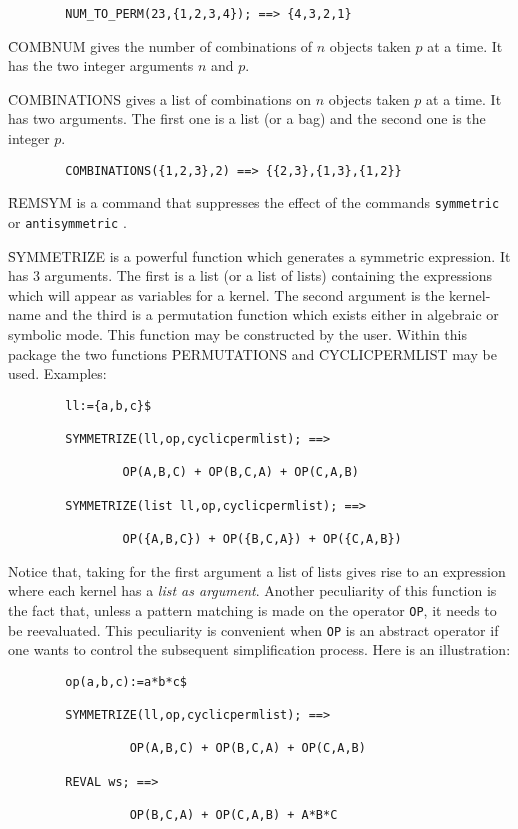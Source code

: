 \begin{itemize}
\begin{verbatim}
        NUM_TO_PERM(23,{1,2,3,4}); ==> {4,3,2,1}
\end{verbatim}
\f{COMBNUM} gives the number of combinations of $n$ objects
taken $p$ at a time. It has the two integer arguments $n$ and $p$.

\f{COMBINATIONS} gives a list of combinations on $n$ objects taken $p$
at a time. It has two arguments. The first one is a list (or a bag) and
the second one is the integer $p$.
\begin{verbatim}
        COMBINATIONS({1,2,3},2) ==> {{2,3},{1,3},{1,2}}
\end{verbatim}
\f{REMSYM} is a command that suppresses the effect of the \REDUCE commands
\verb+symmetric+ or \verb+antisymmetric+ .

\f{SYMMETRIZE} is a powerful function which generates a symmetric expression.
It has 3 arguments. The first is a list (or a list of lists) containing
the expressions which will appear as variables for a kernel. The second
argument is the kernel-name and the third is a permutation function
which exists either in algebraic or symbolic mode. This
function may be constructed by the user. Within this package
the two functions \f{PERMUTATIONS} and \f{CYCLICPERMLIST} may be used.
Examples:
\begin{verbatim}
        ll:={a,b,c}$

        SYMMETRIZE(ll,op,cyclicpermlist); ==>

                OP(A,B,C) + OP(B,C,A) + OP(C,A,B)

        SYMMETRIZE(list ll,op,cyclicpermlist); ==>

                OP({A,B,C}) + OP({B,C,A}) + OP({C,A,B})
\end{verbatim}
Notice that, taking for the first argument a list of lists gives rise to
an expression where  each kernel has a {\em list as argument}. Another
peculiarity of this function is the fact that, unless a pattern matching is
made on the operator \verb+OP+, it needs to be reevaluated. This peculiarity
is convenient when \verb+OP+ is an abstract operator if one wants to 
control the subsequent simplification process. Here is an illustration:
\begin{verbatim}
        op(a,b,c):=a*b*c$

        SYMMETRIZE(ll,op,cyclicpermlist); ==>

                 OP(A,B,C) + OP(B,C,A) + OP(C,A,B)

        REVAL ws; ==>
                 
                 OP(B,C,A) + OP(C,A,B) + A*B*C


\end{verbatim}
\end{itemize}
